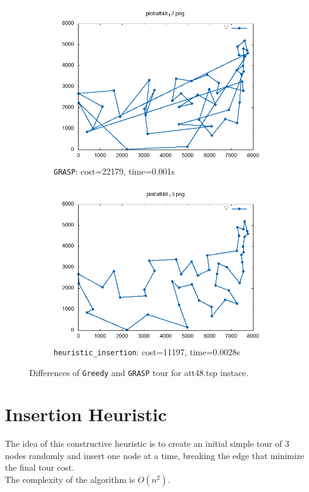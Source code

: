 \begin{figure}[!h]
\begin{subfigure}{.49\textwidth}
	\centering
	\includegraphics[width=\columnwidth]{../res/att48_12_3.png}
	\caption{\texttt{GRASP}: cost=22179, time=0.001s}
	\label{fig:att48_GRASP3}
	\end{subfigure}
	\begin{subfigure}{.49\textwidth}
	\centering
	\includegraphics[width=\columnwidth]{../res/att48_13.png}
	\caption{\texttt{heuristic\_insertion}: cost=11197, time=0.0028s}
	\label{fig:att48_insertion}
	\end{subfigure}
	\caption{Differences of \texttt{Greedy} and \texttt{GRASP} tour for att48.tsp instace.}
	\label{fig:att48_diff}
\end{figure}


\section{Insertion Heuristic}
The idea of this constructive heuristic is to create an initial simple tour of 3 nodes randomly and insert one node at a time, breaking the edge that minimize the final tour cost.\\
The complexity of the algorithm is $ O(n^2) $.


